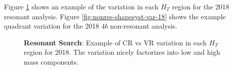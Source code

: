 Figure \ref{fig:res-shapesyst-var-18} shows an example of the variation in each 
$H_{T}$ region for the 2018 resonant analysis. Figure \ref{fig:nonres-shapesyst-var-18}
shows the example quadrant variation for the 2018 $4b$ non-resonant analysis.
\begin{figure}[ht]
	\centering
	\caption{\textbf{Resonant Search}: Example of CR vs VR variation in each $H_{T}$ region 
	for 2018. The variation nicely factorizes into low and high mass components.}
	\label{fig:res-shapesyst-var-18}
\end{figure}
